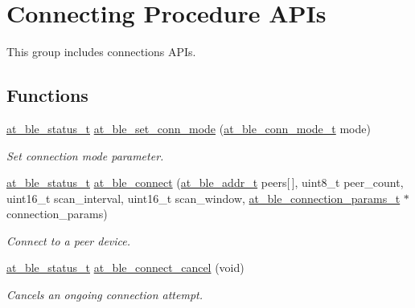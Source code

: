 \hypertarget{group__gap__conn__group}{}\section{Connecting Procedure A\+P\+Is}
\label{group__gap__conn__group}


This group includes connections A\+P\+Is.  


\subsection*{Functions}
\begin{DoxyCompactItemize}
\item 
\mbox{\hyperlink{group__error__codes__group_ga3b1db9b95feb157b3c188ca27fe76988}{at\+\_\+ble\+\_\+status\+\_\+t}} \mbox{\hyperlink{group__gap__conn__group_ga3be5e29faec448c3fa62376482e9bc71}{at\+\_\+ble\+\_\+set\+\_\+conn\+\_\+mode}} (\mbox{\hyperlink{at__ble__api_8h_a53f9993d9d4520af74f601a867e1d379}{at\+\_\+ble\+\_\+conn\+\_\+mode\+\_\+t}} mode)
\begin{DoxyCompactList}\small\item\em Set connection mode parameter. \end{DoxyCompactList}\item 
\mbox{\hyperlink{group__error__codes__group_ga3b1db9b95feb157b3c188ca27fe76988}{at\+\_\+ble\+\_\+status\+\_\+t}} \mbox{\hyperlink{group__gap__conn__group_ga87664cf89bb5c704324c36417cc2ffd5}{at\+\_\+ble\+\_\+connect}} (\mbox{\hyperlink{structat__ble__addr__t}{at\+\_\+ble\+\_\+addr\+\_\+t}} peers\mbox{[}$\,$\mbox{]}, uint8\+\_\+t peer\+\_\+count, uint16\+\_\+t scan\+\_\+interval, uint16\+\_\+t scan\+\_\+window, \mbox{\hyperlink{structat__ble__connection__params__t}{at\+\_\+ble\+\_\+connection\+\_\+params\+\_\+t}} $\ast$connection\+\_\+params)
\begin{DoxyCompactList}\small\item\em Connect to a peer device. \end{DoxyCompactList}\item 
\mbox{\hyperlink{group__error__codes__group_ga3b1db9b95feb157b3c188ca27fe76988}{at\+\_\+ble\+\_\+status\+\_\+t}} \mbox{\hyperlink{group__gap__conn__group_ga54f5ff89635b213302a4354f3923b2ba}{at\+\_\+ble\+\_\+connect\+\_\+cancel}} (void)
\begin{DoxyCompactList}\small\item\em Cancels an ongoing connection attempt. \end{DoxyCompactList}\item 

\end{DoxyCompactItemize}
